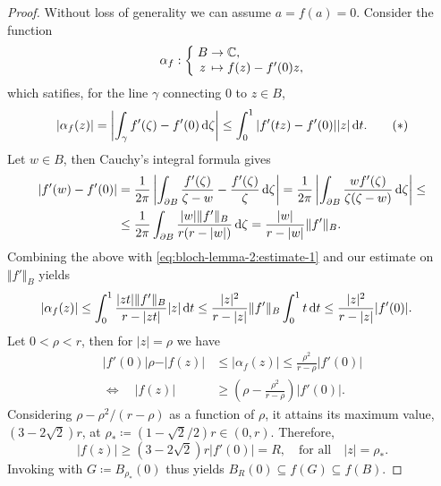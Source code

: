 \begin{proof}
    Without loss of generality we can assume $a = f(a) = 0$. Consider the function
    $$ \mapping{\alpha_f}{B & \to & \C,}{z & \mapsto & f(z) - f'(0) z,} $$
    which satifies, for the line $\gamma$ connecting $0$ to $z \in B$,
    \begin{equation} \label{eq:bloch-lemma-2:estimate-1}
        \vert \alpha_f(z) \vert = \left\vert \int_\gamma f'(\zeta) - f'(0) \mathop{}\!\mathrm{d} \zeta \right\vert \leq \int_0^1 \vert f'(t z) - f'(0) \vert \vert z \vert \mathop{}\!\mathrm{d} t. \tag{\textasteriskcentered}
    \end{equation}
    Let $w \in B$, then Cauchy's integral formula gives
    \begin{align*}
        \vert f'(w) - f'(0) \vert &= \frac{1}{2\pi} \left\vert \int_{\partial B} \frac{f'(\zeta)}{\zeta - w} - \frac{f'(\zeta)}{\zeta} \mathop{}\!\mathrm{d} \zeta \right\vert = \frac{1}{2\pi} \left\vert \int_{\partial B} \frac{w f'(\zeta)}{\zeta (\zeta - w)} \mathop{}\!\mathrm{d} \zeta \right\vert \leq \\
        &\leq \frac{1}{2\pi} \int_{\partial B} \frac{\vert w \vert \Vert f' \Vert_B}{r(r - \vert w \vert)} \mathop{}\!\mathrm{d} \zeta = \frac{\vert w \vert}{r - \vert w \vert} \Vert f' \Vert_B.
    \end{align*}
    Combining the above with \eqref{eq:bloch-lemma-2:estimate-1} and our estimate on $\Vert f' \Vert_B$ yields
    \begin{align*}
        \vert \alpha_f(z) \vert &\leq \int_0^1 \frac{\vert z t \vert \Vert f' \Vert_B}{r - \vert z t \vert} \vert z \vert \mathop{}\!\mathrm{d} t \leq \frac{\vert z \vert^2}{r - \vert z \vert} \Vert f' \Vert_B \int_0^1 t \mathop{}\!\mathrm{d} t \leq \frac{\vert z \vert^2}{r - \vert z \vert} \vert f'(0) \vert.
    \end{align*}
    Let $0 < \rho < r$, then for $\vert z \vert = \rho$ we have
    \begin{align*}
        \vert f'(0) \vert \rho - \vert f(z) \vert &\leq \vert \alpha_f(z) \vert \leq \frac{\rho^2}{r - \rho} \vert f'(0) \vert \\
        \Longleftrightarrow \quad \vert f(z) \vert &\geq \left( \rho - \frac{\rho^2}{r - \rho} \right) \vert f'(0) \vert.
    \end{align*}
    Considering $\rho - \rho^2 / (r - \rho)$ as a function of $\rho$, it attains its maximum value, $(3 - 2 \sqrt{2}) r$, at $\rho_* \coloneqq (1 - \sqrt{2} / 2)r \in (0, r)$. Therefore,
    \begin{equation*}
        \vert f(z) \vert \geq (3 - 2 \sqrt{2}) r \vert f'(0) \vert = R, \quad \textrm{for all} \quad \vert z \vert = \rho_*.
    \end{equation*}
    Invoking  with $G \coloneqq B_{\rho_*}(0)$ thus yields $B_{R}(0) \subseteq f(G) \subseteq f(B)$.
\end{proof}

